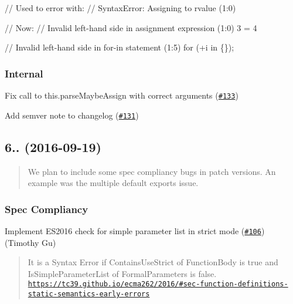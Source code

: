 \begin{DoxyCode}
// Used to error with:
// SyntaxError: Assigning to rvalue (1:0)

// Now:
// Invalid left-hand side in assignment expression (1:0)
3 = 4

// Invalid left-hand side in for-in statement (1:5)
for (+i in \{\});
\end{DoxyCode}


\subsubsection*{Internal}


\begin{DoxyItemize}
\item Fix call to {\ttfamily this.\+parse\+Maybe\+Assign} with correct arguments (\href{https://github.com/babel/babylon/pull/133}{\tt \#133}) 
\item Add semver note to changelog (\href{https://github.com/babel/babylon/pull/131}{\tt \#131}) 
\end{DoxyItemize}

\subsection*{6.. (2016-\/09-\/19)}

\begin{quote}
We plan to include some spec compliancy bugs in patch versions. An example was the multiple default exports issue. \end{quote}


\subsubsection*{Spec Compliancy}


\begin{DoxyItemize}
\item Implement E\+S2016 check for simple parameter list in strict mode (\href{https://github.com/babel/babylon/pull/106}{\tt \#106}) (Timothy Gu)
\end{DoxyItemize}

\begin{quote}
It is a Syntax Error if Contains\+Use\+Strict of Function\+Body is true and Is\+Simple\+Parameter\+List of Formal\+Parameters is false. \href{https://tc39.github.io/ecma262/2016/#sec-function-definitions-static-semantics-early-errors}{\tt https\+://tc39.\+github.\+io/ecma262/2016/\#sec-\/function-\/definitions-\/static-\/semantics-\/early-\/errors} \end{quote}



